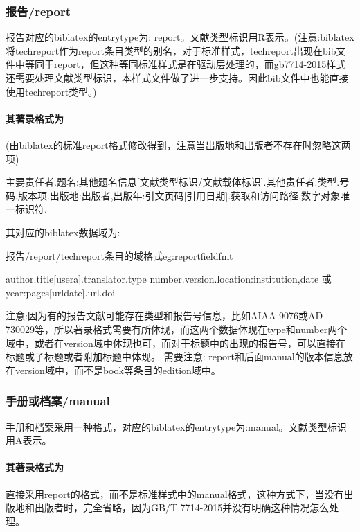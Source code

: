 \subsubsection{报告/report}
\begin{refentry}{}{}
报告对应的biblatex的entrytype为: report。文献类型标识用R表示。(注意:biblatex将techreport作为report条目类型的别名，对于标准样式，techreport出现在bib文件中等同于report，但这种等同标准样式是在驱动层处理的，而gb7714-2015样式还需要处理文献类型标识，本样式文件做了进一步支持。因此bib文件中也能直接使用techreport类型。)

\paragraph{其著录格式为} (由biblatex的标准report格式修改得到，注意当出版地和出版者不存在时忽略这两项)

主要责任者.题名:其他题名信息[文献类型标识/文献载体标识].其他责任者.类型.号码.版本项.出版地:出版者,出版年:引文页码[引用日期].获取和访问路径.数字对象唯一标识符.
\end{refentry}

其对应的biblatex数据域为:
\begin{example}{报告/report/techreport条目的域格式}{eg:reportfieldfmt}
\begin{texlist}
author.title[usera].translator.type number.version.location:institution,date 或year:pages[urldate].url.doi
\end{texlist}
\end{example}

注意:因为有的报告文献可能存在类型和报告号信息，比如AIAA 9076或AD 730029等，所以著录格式需要有所体现，而这两个数据体现在type和number两个域中，或者在version域中体现也可，而对于标题中的出现的报告号，可以直接在标题或子标题或者附加标题中体现。
需要注意: report和后面manual的版本信息放在version域中，而不是book等条目的edition域中。

\subsubsection{手册或档案/manual}
\begin{refentry}{}{}
手册和档案采用一种格式，对应的biblatex的entrytype为:manual。文献类型标识用A表示。

\paragraph{其著录格式为} 直接采用report的格式，而不是标准样式中的manual格式，这种方式下，当没有出版地和出版者时，完全省略，因为GB/T 7714-2015并没有明确这种情况怎么处理。
\end{refentry}


